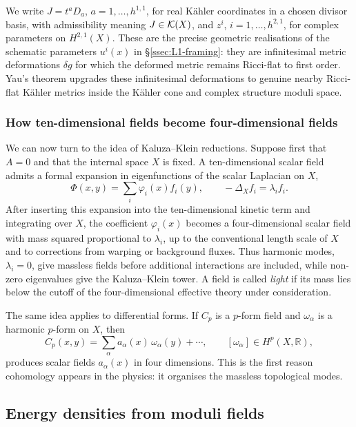 We write $J=t^aD_a$, $a=1,\ldots,h^{1,1}$, for real K\"ahler
coordinates in a chosen divisor basis, with admissibility meaning
$J\in\mathcal{K}(X)$, and $z^i$, $i=1,\ldots,h^{2,1}$, for complex
parameters on $H^{2,1}(X)$.
These are the precise geometric realisations of the schematic
parameters $u^i(x)$ in \S\ref{ssec:L1-framing}: they are
infinitesimal metric deformations $\delta g$ for which the deformed
metric remains Ricci-flat to first order. Yau's theorem upgrades
these infinitesimal deformations to genuine nearby Ricci-flat
K\"ahler metrics inside the K\"ahler cone and complex structure
moduli space.



\subsubsection{How ten-dimensional fields become four-dimensional fields}

We can now turn to the idea of Kaluza--Klein reductions.
Suppose first that $A=0$ and that the
internal space $X$ is fixed. A ten-dimensional scalar field admits
a formal expansion in eigenfunctions of the scalar Laplacian on
$X$,
\begin{equation}
    \Phi(x,y)=\sum_i \varphi_i(x) f_i(y),
    \qquad
    -\Delta_X f_i=\lambda_i f_i .
\end{equation}
After inserting this expansion into the ten-dimensional kinetic
term and integrating over $X$, the coefficient
$\varphi_i(x)$ becomes a four-dimensional scalar field with mass
squared proportional to $\lambda_i$, up to the conventional length
scale of $X$ and to corrections from warping or background fluxes.
Thus harmonic modes, $\lambda_i=0$, give massless fields before
additional interactions are included, while non-zero eigenvalues give
the Kaluza--Klein tower. A field is called \emph{light} if its mass
lies below the cutoff of the four-dimensional effective theory under
consideration.

The same idea applies to differential forms. If $C_p$ is a
$p$-form field and $\omega_\alpha$ is a harmonic $p$-form on
$X$, then
\begin{equation}
    C_p(x,y)=\sum_\alpha a_\alpha(x)\,\omega_\alpha(y)+\cdots,
    \qquad [\omega_\alpha]\in H^p(X,\mathbb{R}),
\end{equation}
produces scalar fields $a_\alpha(x)$ in four dimensions. This is
the first reason cohomology appears in the physics: it organises the
massless topological modes.

\subsection{Energy densities from moduli fields}

